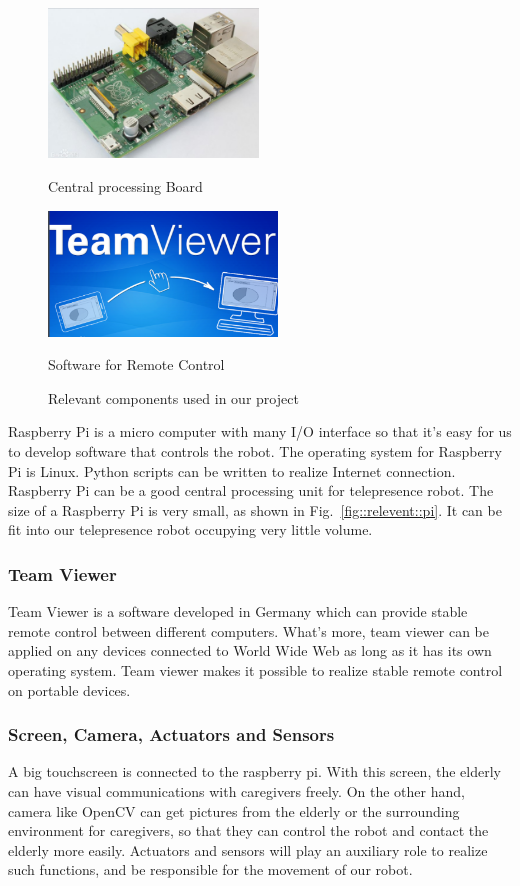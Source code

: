 \documentclass[12pt]{article}
\begin{document}
\begin{figure}[H]
	\begin{minipage}[t]{0.5\linewidth}
		\centering
		\includegraphics[width=2.2in]{P3}
		\caption{Central processing Board\cite{8}}
		\label{fig::relevent::pi}
	\end{minipage}%
	\begin{minipage}[t]{0.5\linewidth}
		\centering
		\includegraphics[width=2.4in]{P4}
		\caption{Software for Remote Control\cite{9}}
		\label{fig::relevent::teamviewer}
	\end{minipage}
	\caption{Relevant components used in our project} 
\end{figure}
Raspberry Pi is a micro computer with many I/O interface so that it's easy for us to develop software that controls the robot. The operating system for Raspberry Pi is Linux. Python scripts can be written to realize Internet connection. Raspberry Pi can be a good central processing unit for telepresence robot. The size of a Raspberry Pi is very small, as shown in Fig.~\ref{fig::relevent::pi}. It can be fit into our telepresence robot occupying very little volume.
\subsubsection{Team Viewer}
Team Viewer is a software developed in Germany which can provide stable remote control between different computers. What's more, team viewer can be applied on any devices connected to World Wide Web as long as it has its own operating system. Team viewer makes it possible to realize stable remote control on portable devices.
\subsubsection{Screen, Camera, Actuators and Sensors}
A big touchscreen is connected to the raspberry pi. With this screen, the elderly can have visual communications with caregivers freely. On the other hand, camera like OpenCV can get pictures from the elderly or the surrounding environment for caregivers, so that they can control the robot and contact the elderly more easily. Actuators and sensors will play an auxiliary role to realize such functions, and be responsible for the movement of our robot.
\end{document}
